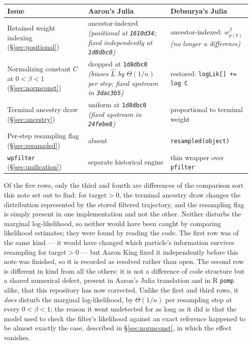 \documentclass[10pt]{article}
\begin{document}
\begin{center}
\begin{tabular}{@{}p{}p{}p{}@{}}
\toprule
\textbf{Issue} & \textbf{Aaron's Julia} & \textbf{Debsurya's Julia} \\
\midrule
Retained weight indexing (\S\ref{sec:positional})
  & ancestor-indexed \newline\emph{(positional at \texttt{1610d34}; fixed independently at \texttt{1d8dbc0})}
  & ancestor-indexed: $w_{p(k)}^\beta$ \newline\emph{(no longer a difference)} \\[0.4em]
Normalizing constant $C$ at $0<\beta<1$ (\S\ref{sec:normconst})
  & dropped at \texttt{1d8dbc0} \newline\emph{(biases $\hat L$ by $\Theta(1/n)$ per step; fixed upstream in \texttt{3dac3b5})}
  & restored: \texttt{logLik[] += log C} \\[0.4em]
Terminal ancestry draw (\S\ref{sec:ancestry})
  & uniform at \texttt{1d8dbc0} \newline\emph{(fixed upstream in \texttt{24febe8})}
  & proportional to terminal weight \\[0.4em]
Per-step resampling flag (\S\ref{sec:resampled})
  & absent
  & \texttt{resampled(object)} \\[0.4em]
\texttt{wpfilter} (\S\ref{sec:unification})
  & separate historical engine
  & thin wrapper over \texttt{pfilter} \\
\bottomrule
\end{tabular}
\end{center}

\noindent Of the five rows, only the third and fourth are differences of the
comparison sort this note set out to find: for $\mathrm{target}>0$, the
terminal ancestry draw changes the distribution represented by the stored
filtered trajectory, and the resampling flag is simply present in one
implementation and not the other. Neither disturbs the marginal
log-likelihood, so neither would have been caught by comparing likelihood
estimates; they were found by reading the code. The first row was of the
same kind — it would have changed which particle's information survives
resampling for $\mathrm{target}>0$ — but Aaron King fixed it independently
before this note was finished, so it is recorded as resolved rather than
open. The second row is different in kind from all the others: it is not a
difference of code structure but a shared numerical defect, present in
Aaron's Julia translation and in R \texttt{pomp} alike, that this
repository has now corrected. Unlike the first and third rows, it
\emph{does} disturb the marginal log-likelihood, by $\Theta(1/n)$ per
resampling step at every $0<\beta<1$; the reason it went undetected for as
long as it did is that the model used to check the filter's likelihood
against an exact reference happened to be almost exactly the case,
described in \S\ref{sec:normconst}, in which the effect vanishes.
\end{document}
